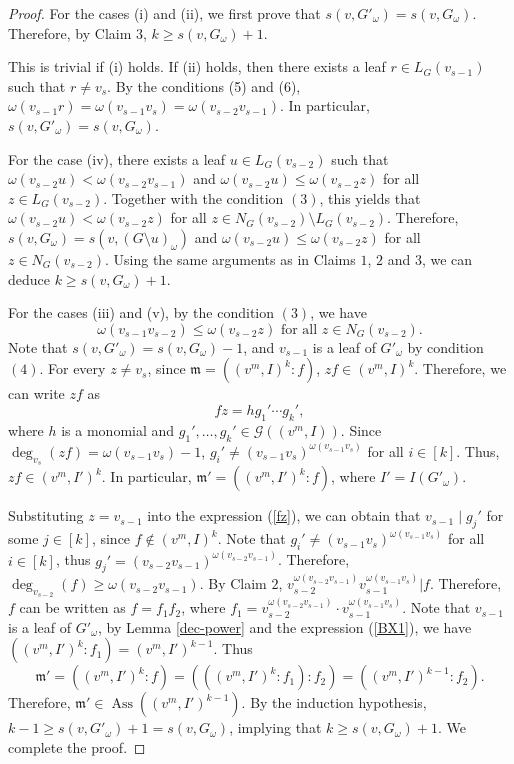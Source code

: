 \documentclass[10pt,a4paper]{amsart}
\DeclareMathOperator{\ass}{Ass}
\def\m {\mathfrak m}
\begin{document}
\begin{proof}
For the cases (i) and (ii),  we  first prove that  $s(v,G'_\omega)=s(v,G_\omega)$. Therefore, by Claim $3$,  $k\ge s(v,G_\omega)+1$.  

This is trivial if (i)  holds. If (ii)  holds, then there exists  a leaf $r\in L_G(v_{s-1})$ such that $r\ne v_s$. By the conditions (5) and (6), $\omega(v_{s-1}r)=\omega(v_{s-1}v_{s})=\omega(v_{s-2}v_{s-1})$. In particular, $s(v,G'_{\omega})=s(v,G_{\omega})$. 


For the case (iv), there exists a leaf $u\in L_G(v_{s-2})$ such that $\omega(v_{s-2}u) < \omega(v_{s-2}v_{s-1})$ and $\omega(v_{s-2}u)\leqslant \omega(v_{s-2}z)$ for all  $z\in L_G(v_{s-2})$. Together with the condition $(3)$, this yields that $\omega(v_{s-2}u)<\omega(v_{s-2}z)$ for all $z\in N_G(v_{s-2})\setminus L_G(v_{s-2})$. Therefore,  $s(v,G_\omega) = s(v, (G\setminus u)_\omega)$ and  $\omega(v_{s-2}u) \leqslant \omega(v_{s-2}z)$  for all  $z\in N_G(v_{s-2})$. 
Using the same arguments  as in   Claims $1$, $2$ and $3$, we can deduce $k\geqslant s(v,G_{\omega})+1$. 

For the cases (iii) and (v), by the condition $(3)$, we have 
\begin{equation}\label{BX1}
	\omega(v_{s-1}v_{s-2}) \leqslant \omega(v_{s-2}z) \text{ for all } z\in N_G(v_{s-2}).
	\tag{$\dag$} 
\end{equation}
Note that $s(v,G'_{\omega})=s(v,G_{\omega})-1$, and  $v_{s-1}$ is a leaf of $G'_{\omega}$  by condition $(4)$. For every $z\ne v_s$, since $\m = ((v^m,I)^k \colon f)$, $zf\in (v^m,I)^k$. Therefore,  we can write $zf$ as 
\begin{equation}\label{fz}
	fz = h g_1'\cdots g_k',
	\tag{$\ddag$} 
\end{equation}
where $h$ is a monomial and $g_1',\ldots,g_k'\in \mathcal{G}((v^m,I))$. Since  $\deg_{v_s}(zf)=\omega(v_{s-1}v_s)-1$, $g_i'\ne (v_{s-1}v_s)^{\omega(v_{s-1}v_s)}$ for all $i\in[k]$. Thus, $zf\in (v^m,I')^k$.  In particular, $\m'=((v^m,I')^k\colon f)$,
where $I'=I(G'_\omega)$. 

Substituting  $z=v_{s-1}$ into the expression  (\ref{fz}), we can obtain  that $v_{s-1}\mid g_j'$ for some $j\in[k]$, since $f\notin (v^m,I)^k$.
Note that $g_i'\ne (v_{s-1}v_s)^{\omega(v_{s-1}v_s)}$ for all $i\in [k]$, thus $g_j'=(v_{s-2}v_{s-1})^{\omega(v_{s-2}v_{s-1})}$. Therefore, $\deg_{v_{s-2}}(f)\geqslant \omega(v_{s-2}v_{s-1})$.
By Claim $2$, $v_{s-2}^{\omega(v_{s-2}v_{s-1})}v_{s-1}^{\omega(v_{s-1}v_s)}|f$. Therefore, $f$ can be written as  $f=f_1f_2$, where $f_1= v_{s-2}^{\omega(v_{s-2}v_{s-1})}\cdot v_{s-1}^{\omega(v_{s-1}v_s)}$.
Note that $v_{s-1}$ is a leaf of $G'_{\omega}$, by Lemma \ref{dec-power} and  the expression (\ref{BX1}), we have $((v^m, I')^k \colon f_1)=(v^m, I')^{k-1}$. Thus
$$
\m'= ((v^m, I')^k \colon f) = (((v^m, I')^k \colon f_1)\colon f_2) = ((v^m, I')^{k-1}\colon f_2).
$$
Therefore, $\m'\in\ass((v^m, I')^{k-1})$. By the induction hypothesis, $k-1\geqslant s(v,G'_{\omega})+1=s(v,G_{\omega})$,  implying  that $k\geqslant s(v,G_{\omega})+1$.
We complete the  proof.
\end{proof}
\end{document}
